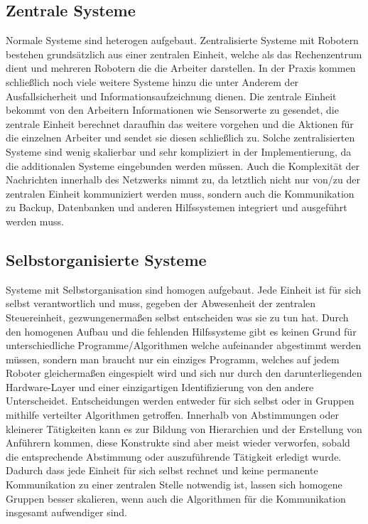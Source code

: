\subsection*{Zentrale Systeme}\label{subsec:ZentraleSysteme}
Normale Systeme sind heterogen aufgebaut.
Zentralisierte Systeme mit Robotern bestehen grundsätzlich aus einer zentralen Einheit, welche als das Rechenzentrum dient und mehreren Robotern die die Arbeiter darstellen.
In der Praxis kommen schließlich noch viele weitere Systeme hinzu die unter Anderem der Ausfallsicherheit und Informationsaufzeichnung dienen.
Die zentrale Einheit bekommt von den Arbeitern Informationen wie Sensorwerte zu gesendet, die zentrale Einheit berechnet daraufhin das weitere vorgehen und die Aktionen für die einzelnen Arbeiter und sendet sie diesen schließlich zu.
Solche zentralisierten Systeme sind wenig skalierbar und sehr kompliziert in der Implementierung, da die additionalen Systeme eingebunden werden müssen.
Auch die Komplexität der Nachrichten innerhalb des Netzwerks nimmt zu, da letztlich nicht nur von/zu der zentralen Einheit kommuniziert werden muss, sondern auch die Kommunikation zu Backup, Datenbanken und anderen Hilfssystemen integriert und ausgeführt werden muss.

\subsection*{Selbstorganisierte Systeme}\label{subsec:SelbstorganisierteSysteme}
Systeme mit Selbstorganisation sind homogen aufgebaut.
Jede Einheit ist für sich selbst verantwortlich und muss, gegeben der Abwesenheit der zentralen Steuereinheit, gezwungenermaßen selbst entscheiden was sie zu tun hat.
Durch den homogenen Aufbau und die fehlenden Hilfssysteme gibt es keinen Grund für unterschiedliche Programme/Algorithmen welche aufeinander abgestimmt werden müssen, sondern man braucht nur ein einziges Programm, welches auf jedem Roboter gleichermaßen eingespielt wird und sich nur durch den darunterliegenden Hardware-Layer und einer einzigartigen Identifizierung von den andere Unterscheidet.
Entscheidungen werden entweder für sich selbst oder in Gruppen mithilfe verteilter Algorithmen getroffen.
Innerhalb von Abstimmungen oder kleinerer Tätigkeiten kann es zur Bildung von Hierarchien und der Erstellung von Anführern kommen, diese Konstrukte sind aber meist wieder verworfen, sobald die entsprechende Abstimmung oder auszuführende Tätigkeit erledigt wurde.
Dadurch dass jede Einheit für sich selbst rechnet und keine permanente Kommunikation zu einer zentralen Stelle notwendig ist, lassen sich homogene Gruppen besser skalieren, wenn auch die Algorithmen für die Kommunikation insgesamt aufwendiger sind.

